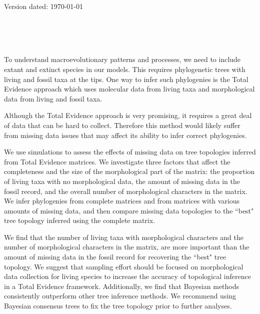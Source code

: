 \documentclass[a4paper,11pt]{article}
\begin{document}
\fontsize{12pt}{1.5}
\begin{flushright}
Version dated: \today
\end{flushright}
\begin{center}


\\
\bigskip
\\
\\

\end{center}

To understand macroevolutionary patterns and processes, we need to include extant and extinct species in our models. This requires phylogenetic trees with living and fossil taxa at the tips. One way to infer such phylogenies is the Total Evidence approach which uses molecular data from living taxa and morphological data from living and fossil taxa.

Although the Total Evidence approach is very promising, it requires a great deal of data that can be hard to collect. Therefore this method would likely suffer from missing data issues that may affect its ability to infer correct phylogenies.

We use simulations to assess the effects of missing data on tree topologies inferred from Total Evidence matrices. We investigate three factors that affect the completeness and the size of the morphological part of the matrix: the proportion of living taxa with no morphological data, the amount of missing data in the fossil record, and the overall number of morphological characters in the matrix. We infer phylogenies from complete matrices and from matrices with various amounts of missing data, and then compare missing data topologies to the ``best" tree topology inferred using the complete matrix.

We find that the number of living taxa with morphological characters and the number of morphological characters in the matrix, are more important than the amount of missing data in the fossil record for recovering the ``best" tree topology. We suggest that sampling effort should be focused on morphological data collection for living species to increase the accuracy of topological inference in a Total Evidence framework. Additionally, we find that Bayesian methods consistently outperform other tree inference methods. We recommend using Bayesian consensus trees to fix the tree topology prior to further analyses.
\end{document}

